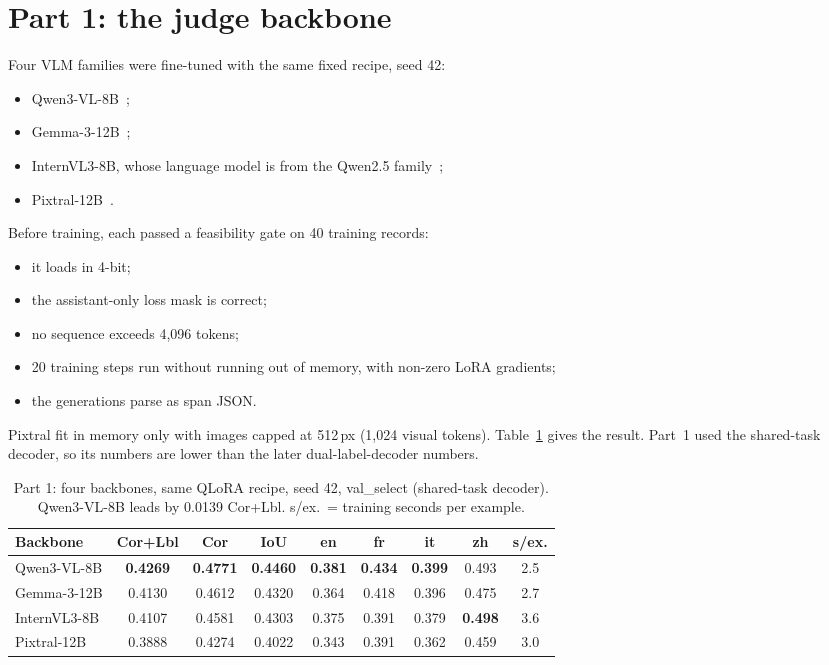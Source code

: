\section{Part 1: the judge backbone}\label{sec:exp-part1}

Four VLM families were fine-tuned with the same fixed recipe, seed 42:
\begin{itemize}
    \item Qwen3-VL-8B~\cite{bai2025qwen3};
    \item Gemma-3-12B~\cite{gemma2025gemma3};
    \item InternVL3-8B, whose language model is from the Qwen2.5 family~\cite{zhu2025internvl3};
    \item Pixtral-12B~\cite{agrawal2024pixtral}.
\end{itemize}
Before training, each passed a feasibility gate on 40 training records:
\begin{itemize}
    \item it loads in 4-bit;
    \item the assistant-only loss mask is correct;
    \item no sequence exceeds 4,096 tokens;
    \item 20 training steps run without running out of memory, with non-zero LoRA gradients;
    \item the generations parse as span JSON.
\end{itemize}
Pixtral fit in memory only with images capped at 512\,px (1,024 visual tokens). Table~\ref{tab:part1} gives the result. Part~1 used the shared-task decoder, so its numbers are lower than the later dual-label-decoder numbers.

\begin{table}[!htb]
    \centering
    \caption{Part 1: four backbones, same QLoRA recipe, seed 42, val\_select (shared-task decoder). Qwen3-VL-8B leads by 0.0139 Cor+Lbl. s/ex.\ = training seconds per example.}
    \label{tab:part1}
    \begin{tabular}{lcccccccc}
    \toprule
    Backbone & Cor+Lbl & Cor & IoU & en & fr & it & zh & s/ex. \\
    \midrule
    Qwen3-VL-8B & \textbf{0.4269} & \textbf{0.4771} & \textbf{0.4460} & \textbf{0.381} & \textbf{0.434} & \textbf{0.399} & 0.493 & 2.5 \\
    Gemma-3-12B & 0.4130 & 0.4612 & 0.4320 & 0.364 & 0.418 & 0.396 & 0.475 & 2.7 \\
    InternVL3-8B & 0.4107 & 0.4581 & 0.4303 & 0.375 & 0.391 & 0.379 & \textbf{0.498} & 3.6 \\
    Pixtral-12B & 0.3888 & 0.4274 & 0.4022 & 0.343 & 0.391 & 0.362 & 0.459 & 3.0 \\
    \bottomrule
    \end{tabular}
\end{table}

